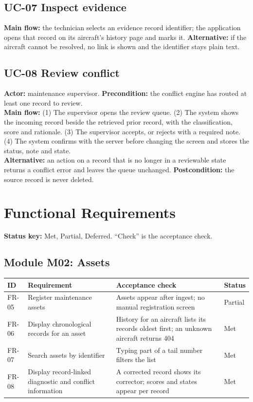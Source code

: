 \subsection*{UC-07 Inspect evidence}
\textbf{Main flow:} the technician selects an evidence record identifier; the application opens that record on its aircraft's history page and marks it. \textbf{Alternative:} if the aircraft cannot be resolved, no link is shown and the identifier stays plain text.

\subsection*{UC-08 Review conflict}
\textbf{Actor:} maintenance supervisor. \textbf{Precondition:} the conflict engine has routed at least one record to review.\\
\textbf{Main flow:} (1) The supervisor opens the review queue. (2) The system shows the incoming record beside the retrieved prior record, with the classification, score and rationale. (3) The supervisor accepts, or rejects with a required note. (4) The system confirms with the server before changing the screen and stores the status, note and  state.\\
\textbf{Alternative:} an action on a record that is no longer in a reviewable state returns a conflict error and leaves the queue unchanged. \textbf{Postcondition:} the source record is never deleted.

\section{Functional Requirements}
\textbf{Status key:} Met, Partial, Deferred. ``Check'' is the acceptance check.

\subsection{Module M02: Assets}
\begin{longtable}{p{}p{}p{}p{}}
\toprule \textbf{ID} & \textbf{Requirement} & \textbf{Acceptance check} & \textbf{Status} \\ \midrule \endhead
FR-05 & Register maintenance assets & Assets appear after ingest; no manual registration screen & Partial \\
FR-06 & Display chronological records for an asset & History for an aircraft lists its records oldest first; an unknown aircraft returns 404 & Met \\
FR-07 & Search assets by identifier & Typing part of a tail number filters the list & Met \\
FR-08 & Display record-linked diagnostic and conflict information & A corrected record shows its corrector; scores and states appear per record & Met \\
\bottomrule
\end{longtable}

